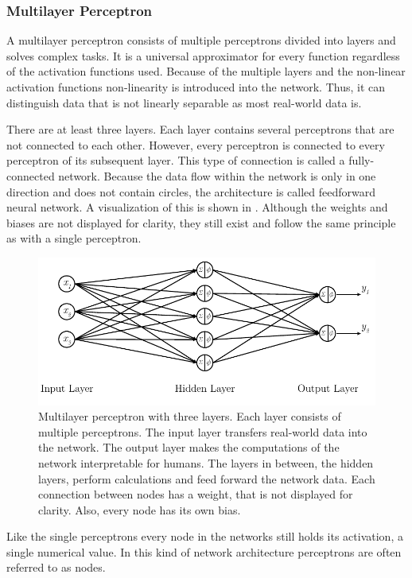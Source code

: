\subsubsection{Multilayer Perceptron}
\label{sec:mlp-multilayer-perceptron}
A multilayer perceptron consists of multiple perceptrons divided into layers and solves complex tasks\cite{Bishop1995}.
It is a universal approximator for every function\cite{Cybenko1989} regardless of the activation functions used\cite{Hornik1991}.
Because of the multiple layers and the non-linear activation functions non-linearity is introduced into the network.
Thus, it can distinguish data that is not linearly separable as most real-world data is.

There are at least three layers.
Each layer contains several perceptrons that are not connected to each other.
However, every perceptron is connected to every perceptron of its subsequent layer.
This type of connection is called a fully-connected network.
Because the data flow within the network is only in one direction and does not contain circles, the architecture is called feedforward neural network.
A visualization of this is shown in .
Although the weights and biases are not displayed for clarity, they still exist and follow the same principle as with a single perceptron.
\begin{figure}
	\centering
	\includegraphics{images/multilayer-perceptron}
	\caption[Multilayer Perceptron]{Multilayer perceptron with three layers. Each layer consists of multiple perceptrons. The input layer transfers real-world data into the network. The output layer makes the computations of the network interpretable for humans. The layers in between, the hidden layers, perform calculations and feed forward the network data. Each connection between nodes has a weight, that is not displayed for clarity. Also, every node has its own bias.}
	\label{fig:multilayer-perceptron}
\end{figure}
Like the single perceptrons every node in the networks still holds its activation, a single numerical value.
In this kind of network architecture perceptrons are often referred to as nodes.

